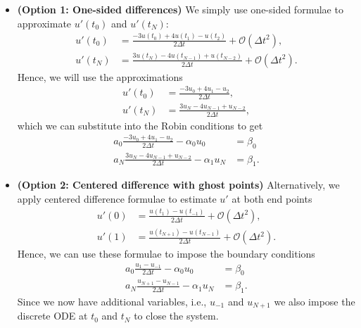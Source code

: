 \begin{itemize}
    \item {\bf (Option 1: One-sided differences)}
    We simply use one-sided formulae to approximate $u'(t_0)$ and 
    $u'(t_N)$: 
    \begin{equation*}
        \begin{aligned}
        u'(t_0) & = \frac{ - 3 u(t_0) + 4 u(t_1) - u(t_2)}{2 \Delta t} 
        + \mathcal{O}(\Delta t^2), \\
        u'(t_N) & = \frac{3 u(t_N) - 4 u(t_{N-1}) + u(t_{N-2})}{2 \Delta t}
        + \mathcal{O}(\Delta t^2).
        \end{aligned}
    \end{equation*}
    Hence, we will use the approximations 
    \begin{equation*}
        \begin{aligned}
        u'(t_0) & = \frac{-3 u_0 + 4 u_1 - u_2}{2 \Delta t}, \\
        u'(t_N) & = \frac{3 u_N - 4 u_{N-1} + u_{N-2}}{2 \Delta t},
        \end{aligned}
    \end{equation*}
    which we can substitute into the Robin conditions 
    to get 
    \begin{equation}\label{eq:l17:robin-one-sided}
        \begin{aligned}
            a_0 \frac{-3 u_0 + 4 u_1 - u_2}{2 \Delta t}
            - \alpha_0 u_0  & = \beta_0 \\
            a_N \frac{3 u_N - 4 u_{N-1} + u_{N-2}}{2 \Delta t}
            - \alpha_1 u_N & = \beta_1.
        \end{aligned}
    \end{equation}


    \item {\bf (Option 2: Centered difference with 
    ghost points)} 
    Alternatively, we apply centered difference formulae 
    to estimate $u'$ at both end points 
    \begin{equation*}
        \begin{aligned}
            u'(0) & = \frac{u(t_1) - u(t_{-1})}{2 \Delta t} + \mathcal{O}(\Delta t^2), \\
            u'(1) & = \frac{u(t_{N+1}) - u(t_{N-1})}{2 \Delta t} + \mathcal{O}(\Delta t^2).
        \end{aligned}
    \end{equation*}
    Hence, we can use these formulae to impose the 
    boundary conditions 
    \begin{equation}\label{eq:l17:robin-centered}
        \begin{aligned}
            a_0 \frac{u_1 - u_{-1}}{2 \Delta t}
            - \alpha_0 u_0  & = \beta_0 \\
            a_N \frac{u_{N+1} -  u_{N-1}}{2 \Delta t}
            - \alpha_1 u_N & = \beta_1.
        \end{aligned}
    \end{equation}
    Since we now have additional variables, i.e., $u_{-1}$ and 
    $u_{N+1}$ we also impose the discrete ODE at 
    $t_0$ and $t_N$ to close the system.
\end{itemize}


